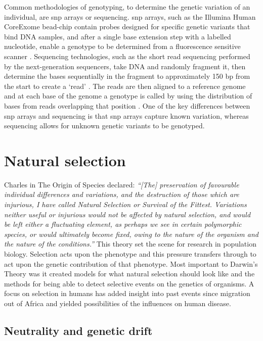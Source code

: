 \documentclass[]{report}
\begin{document}
Common methodologies of genotyping, to determine the genetic variation
of an individual, are \gls{snp} arrays or sequencing. \Gls{snp} arrays,
such as the Illumina Human CoreExome bead-chip contain probes designed
for specific genetic variants that bind DNA samples, and after a single
base extension step with a labelled nucleotide, enable a genotype to be
determined from a fluorescence sensitive scanner
\citep{Wang1998, Gunderson2005, Shen2005}. Sequencing technologies, such
as the short read sequencing performed by the next-generation
sequencers, take DNA and randomly fragment it, then determine the bases
sequentially in the fragment to approximately 150 bp from the start to
create a `read' \citep{Metzker2010}. The reads are then aligned to a
reference genome and at each base of the genome a genotype is called by
using the distribution of bases from reads overlapping that position
\citep{Li2008, mckenna2010genome}. One of the key differences between
\gls{snp} arrays and sequencing is that \gls{snp} arrays capture known
variation, whereas sequencing allows for unknown genetic variants to be
genotyped.

\section{Natural selection}\label{natural-selection}

Charles \citet{darwin1909origin} in The Origin of Species declared:
\emph{``{[}The{]} preservation of favourable individual differences and
variations, and the destruction of those which are injurious, I have
called Natural Selection or Survival of the Fittest. Variations neither
useful or injurious would not be affected by natural selection, and
would be left either a fluctuating element, as perhaps we see in certain
polymorphic species, or would ultimately become fixed, owing to the
nature of the organism and the nature of the conditions.''} This theory
set the scene for research in population biology. Selection acts upon
the phenotype and this pressure transfers through to act upon the
genetic contribution of that phenotype. Most important to Darwin's
Theory was it created models for what natural selection should look like
and the methods for being able to detect selective events on the
genetics of organisms. A focus on selection in humans has added insight
into past events since migration out of Africa \citep{Soares2012} and
yielded possibilities of the influences on human disease.

\subsection{Neutrality and genetic
drift}\label{neutrality-and-genetic-drift}
\end{document}
